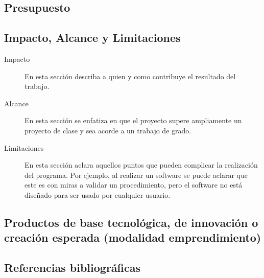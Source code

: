 \documentclass{article}
\begin{document}
\subsection*{Presupuesto}
\noindent 

\subsection*{Impacto, Alcance y Limitaciones}
\begin{description}
\item[Impacto] En esta sección describa a quien y como contribuye el resultado del trabajo. 
\item[Alcance] En esta sección se enfatiza en que el proyecto supere ampliamente un proyecto de clase y sea acorde a un trabajo de grado.
\item[Limitaciones] En esta sección aclara aquellos puntos que pueden complicar la realización del programa. Por ejemplo, al realizar un software se puede aclarar que este es con miras a validar un procedimiento, pero el software no está diseñado para ser usado por cualquier usuario. 
\end{description}



\subsection*{Productos de base tecnológica, de innovación o creación esperada (modalidad emprendimiento)}
\noindent 

\subsection*{Referencias bibliográficas}
\noindent 
\end{document}
